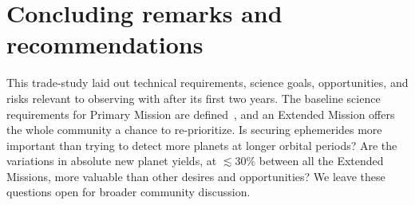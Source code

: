 \section{Concluding remarks and recommendations}
\label{sec:conclusions}

This trade-study laid out technical requirements, science goals, opportunities, and risks relevant to observing with \tess after its first two years.
The baseline science requirements for \tesss Primary Mission are 
defined~\citep{ricker_transiting_2014}, and an Extended Mission offers the
whole community a chance to re-prioritize.
Is securing \tesss ephemerides more important than trying to detect more
planets at longer orbital periods? 
Are the variations in absolute new planet yields, at $\lesssim30\%$ between all 
the Extended Missions, more valuable than other desires and opportunities?
We leave these questions open for broader community discussion.


